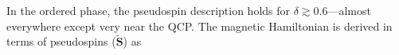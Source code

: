 In the ordered phase, the pseudospin description holds for $\delta\gtrsim0.6$---almost everywhere except very near the QCP. The magnetic Hamiltonian is derived in terms of pseudospins ($\tilde{\mathbf{S}}$) as